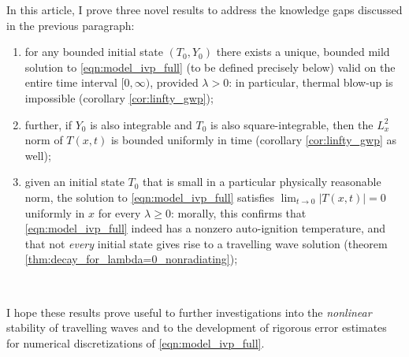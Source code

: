 \documentclass[twosided, 12pt]{article}
\numberwithin{equation}{section}
\theoremstyle{plain}
\begin{document}
\par In this article, I prove three novel results to address the knowledge gaps discussed in the previous paragraph:
\par \noindent 
\begin{enumerate}
    \item for any bounded initial state $\left(T_0, Y_0\right)$ there exists a unique, bounded mild solution to \eqref{eqn:model_ivp_full} (to be defined precisely below) valid on the entire time interval $[0,\infty)$, provided $\lambda >0$: in particular, thermal blow-up is impossible (corollary \ref{cor:linfty_gwp});
    \item further, if $Y_0$ is also integrable and $T_0$ is also square-integrable, then the $L^2_x$ norm of $T(x,t)$ is bounded uniformly in time (corollary \ref{cor:linfty_gwp} as well);
    \item given an initial state $T_0$ that is small in a particular physically reasonable norm, the solution to \eqref{eqn:model_ivp_full} satisfies $\lim_{t\rightarrow 0}|T(x,t)| = 0$ uniformly in $x$ for every $\lambda \geq 0$: morally, this confirms that \eqref{eqn:model_ivp_full} indeed has a nonzero auto-ignition temperature, and that not \emph{every} initial state gives rise to a travelling wave solution (theorem \ref{thm:decay_for_lambda=0_nonradiating});
\end{enumerate} 
\ \par \noindent 
I hope these results prove useful to further investigations into the \emph{nonlinear} stability of travelling waves and to the development of rigorous error estimates for numerical discretizations of \eqref{eqn:model_ivp_full}. 
\end{document}
